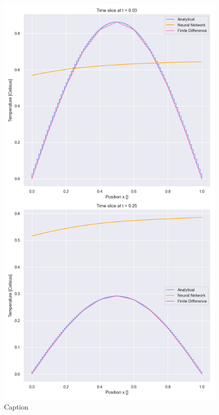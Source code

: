 \begin{figure}
    \centering
    \includegraphics[width=1.0\linewidth]{project_3/plots/time_slices_comparison.png}
    \caption{Caption}
    \label{fig:enter-label}
\end{figure}

